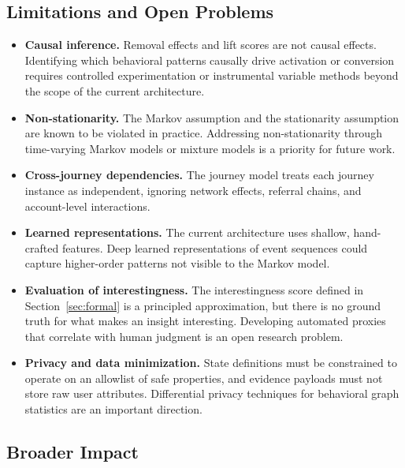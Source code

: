 \documentclass[12pt, a4paper]{article}
\begin{document}
\subsection{Limitations and Open Problems}

\begin{itemize}[leftmargin=1.5em]
  \item \textbf{Causal inference.} Removal effects and lift scores are not causal effects. Identifying which behavioral patterns causally drive activation or conversion requires controlled experimentation or instrumental variable methods beyond the scope of the current architecture.

  \item \textbf{Non-stationarity.} The Markov assumption and the stationarity assumption are known to be violated in practice. Addressing non-stationarity through time-varying Markov models or mixture models \cite{harbich2017} is a priority for future work.

  \item \textbf{Cross-journey dependencies.} The journey model treats each journey instance as independent, ignoring network effects, referral chains, and account-level interactions.

  \item \textbf{Learned representations.} The current architecture uses shallow, hand-crafted features. Deep learned representations of event sequences could capture higher-order patterns not visible to the Markov model.

  \item \textbf{Evaluation of interestingness.} The interestingness score defined in Section~\ref{sec:formal} is a principled approximation, but there is no ground truth for what makes an insight interesting. Developing automated proxies that correlate with human judgment is an open research problem.

  \item \textbf{Privacy and data minimization.} State definitions must be constrained to operate on an allowlist of safe properties, and evidence payloads must not store raw user attributes. Differential privacy techniques for behavioral graph statistics are an important direction.
\end{itemize}

\subsection{Broader Impact}
\end{document}
